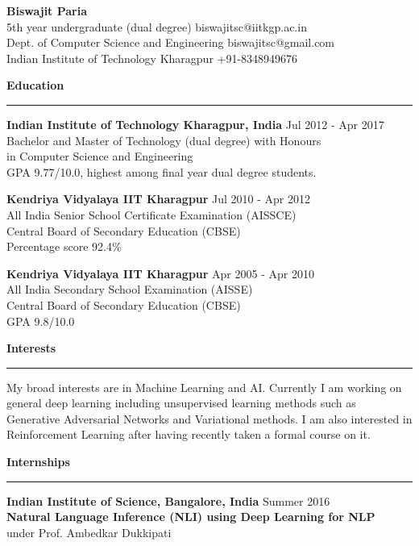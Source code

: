 \documentclass[10pt]{article}
\newcommand{\heading}[1]{
 {\large \textbf{#1}}
  \vspace{0.4em}
  \hrule
  \vspace{0.4em}
}
\newcommand{\EntryGap}{\vspace{0.5cm}}
\newcommand{\SmallEntryGap}{\vspace{0.2cm}}
\begin{document}

{\Large \textbf{Biswajit Paria}}\\
5th year undergraduate (dual degree) \hfill biswajitsc@iitkgp.ac.in\\
Dept. of Computer Science and Engineering \hfill biswajitsc@gmail.com\\
Indian Institute of Technology Kharagpur \hfill  +91-8348949676  
\EntryGap



\heading{Education}

\textbf{Indian Institute of Technology Kharagpur, India} \hfill Jul 2012 - Apr 2017\\
Bachelor and Master of Technology (dual degree) with Honours\\
in Computer Science and Engineering\\
GPA 9.77/10.0, highest among final year dual degree students.

\SmallEntryGap
\textbf{Kendriya Vidyalaya IIT Kharagpur} \hfill Jul 2010 - Apr 2012\\
All India Senior School Certificate Examination (AISSCE)\\
Central Board of Secondary Education (CBSE)\\
Percentage score 92.4\%

\SmallEntryGap
\textbf{Kendriya Vidyalaya IIT Kharagpur} \hfill Apr 2005 - Apr 2010\\
All India Secondary School Examination (AISSE)\\
Central Board of Secondary Education (CBSE)\\
GPA 9.8/10.0

\EntryGap
\heading{Interests}

My broad interests are in Machine Learning and AI. Currently I am working
on general deep learning including unsupervised learning methods
such as Generative Adversarial Networks and Variational methods.
I am also interested in Reinforcement Learning after having recently taken
a formal course on it.

\EntryGap



\heading{Internships}

\textbf{Indian Institute of Science, Bangalore, India} \hfill Summer 2016\\
\textbf{Natural Language Inference (NLI) using Deep Learning for NLP}\\
under Prof. Ambedkar Dukkipati
\end{document}
